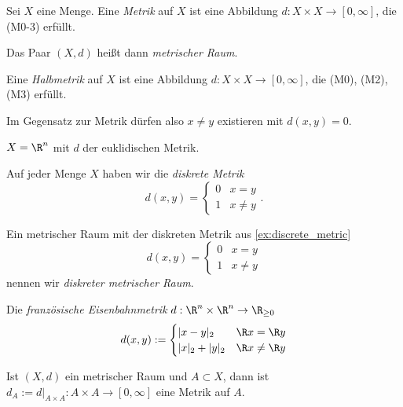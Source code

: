 \begin{df}[Metrik]
	Sei $X$ eine Menge.
	Eine \emph{Metrik} auf $X$ ist eine Abbildung $d : X \times X \to [0, \infty]$, die (M0-3) erfüllt.

	Das Paar $(X,d)$ heißt dann \emph{metrischer Raum}.
\end{df}

\begin{df}[Halbmetrik] \label{df:pseudometric}
	Eine \emph{Halbmetrik} auf $X$ ist eine Abbildung $d: X \times X \to [0, \infty]$, die (M0), (M2), (M3) erfüllt.
	\begin{note}
		Im Gegensatz zur Metrik dürfen also $x \neq y$ existieren mit $d(x,y) = 0$.
	\end{note}
\end{df}

\begin{ex}
	$X = \R^n$ mit $d$ der euklidischen Metrik.
\end{ex}

\begin{ex} \label{ex:discrete_metric}
	Auf jeder Menge $X$ haben wir die \emph{diskrete Metrik}
	\[
		d(x,y) = \begin{cases}
			0 & x=y \\
			1 & x\neq y
		\end{cases}.
	\]
\end{ex}

\begin{df}
	Ein metrischer Raum mit der diskreten Metrik aus \ref{ex:discrete_metric}
	\[
		d(x,y) = \begin{cases}
			0 & x=y \\
			1 & x\neq y
		\end{cases}
	\]
	nennen wir \emph{diskreter metrischer Raum}.
\end{df}

\begin{ex}
	Die \emph{französische Eisenbahnmetrik} $d: \R^n \times \R^n \to \R_{\ge 0}$
	\[
		d(x,y) := \begin{cases}
			|x-y|_2 & \R x = \R y \\
			|x|_2 + |y|_2 & \R x \neq \R y
		\end{cases}
	\]
\end{ex}

\begin{ex}[Teilräume]
	Ist $(X,d)$ ein metrischer Raum und $A \subset X$, dann ist $d_A := d\big|_{A\times A} : A \times A \to [0,\infty]$ eine Metrik auf $A$.
\end{ex}

